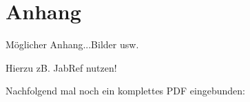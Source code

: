 \chapter{Anhang}
\label{scr:Anhang}
Möglicher Anhang...Bilder usw.

Hierzu zB. JabRef nutzen!



Nachfolgend mal noch ein komplettes PDF eingebunden:

